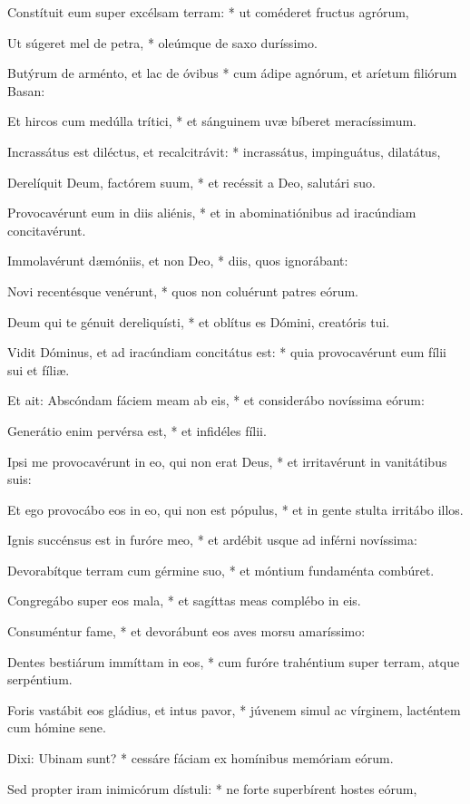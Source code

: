 Constítuit eum super excélsam terram: * ut coméderet fructus agrórum,

Ut súgeret mel de petra, * oleúmque de saxo duríssimo.

Butýrum de arménto, et lac de óvibus * cum ádipe agnórum, et aríetum filiórum Basan:

Et hircos cum medúlla trítici, * et sánguinem uvæ bíberet meracíssimum.

Incrassátus est diléctus, et recalcitrávit: * incrassátus, impinguátus, dilatátus,

Derelíquit Deum, factórem suum, * et recéssit a Deo, salutári suo.

Provocavérunt eum in diis aliénis, * et in abominatiónibus ad iracúndiam concitavérunt.

Immolavérunt dæmóniis, et non Deo, * diis, quos ignorábant:

Novi recentésque venérunt, * quos non coluérunt patres eórum.

Deum qui te génuit dereliquísti, * et oblítus es Dómini, creatóris tui.

Vidit Dóminus, et ad iracúndiam concitátus est: * quia provocavérunt eum fílii sui et fíliæ.

Et ait: Abscóndam fáciem meam ab eis, * et considerábo novíssima eórum:

Generátio enim pervérsa est, * et infidéles fílii.

Ipsi me provocavérunt in eo, qui non erat Deus, * et irritavérunt in vanitátibus suis:

Et ego provocábo eos in eo, qui non est pópulus, * et in gente stulta irritábo illos.

Ignis succénsus est in furóre meo, * et ardébit usque ad inférni novíssima:

Devorabítque terram cum gérmine suo, * et móntium fundaménta combúret.

Congregábo super eos mala, * et sagíttas meas complébo in eis.

Consuméntur fame, * et devorábunt eos aves morsu amaríssimo:

Dentes bestiárum immíttam in eos, * cum furóre trahéntium super terram, atque serpéntium.

Foris vastábit eos gládius, et intus pavor, * júvenem simul ac vírginem, lacténtem cum hómine sene.

Dixi: Ubinam sunt? * cessáre fáciam ex homínibus memóriam eórum.

Sed propter iram inimicórum dístuli: * ne forte superbírent hostes eórum,

